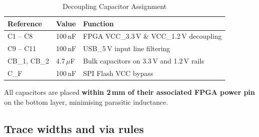 \documentclass[11pt,a4paper]{article}
\begin{document}
\begin{table}[H]
  \centering
  \caption{Decoupling Capacitor Assignment}
  \begin{tabularx}{\linewidth}{C{2.5cm}C{2cm}L{8cm}}
    \toprule
    \textbf{Reference} & \textbf{Value} & \textbf{Function} \\
    \midrule
    C1 – C8      & 100\,nF     & FPGA VCC\_3.3\,V \& VCC\_1.2\,V decoupling \\
    C9 – C11     & 100\,nF     & USB\_5\,V input line filtering \\
    CB\_1, CB\_2 & 4.7\,$\mu$F & Bulk capacitors on 3.3\,V and 1.2\,V rails \\
    C\_F         & 100\,nF     & SPI Flash VCC bypass \\
    \bottomrule
  \end{tabularx}
\end{table}

All capacitors are placed \textbf{within 2\,mm of their associated FPGA power
pin} on the bottom layer, minimising parasitic inductance.

\subsection{Trace widths and via rules}
\end{document}
